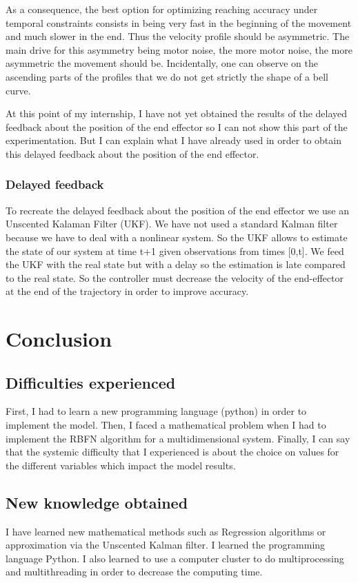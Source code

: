 \documentclass[pdftex,a4paper,12pt]{report}
\begin{document}
As a consequence, the best option for optimizing reaching accuracy under
temporal constraints consists in being very fast in the beginning of the movement
and much slower in the end. Thus the velocity profile should be asymmetric. The main drive
for this asymmetry being motor noise, the more motor noise, the more asymmetric the movement should be.
Incidentally, one can observe on the ascending parts of the profiles that we do not get strictly the shape of a bell curve.

At this point of my internship, I have not yet obtained the results of the delayed feedback about the position of the end effector so I can not show this part of the experimentation.
But I can explain what I have already used in order to obtain this delayed feedback about the position of the end effector.

\subsection{Delayed feedback}
To recreate the delayed feedback about the position of the end effector we use an Unscented Kalaman Filter (UKF). We have not used a standard Kalman filter because we have to deal with a nonlinear system.
So the UKF allows to estimate the state of our system at time t+1 given observations from times [0,t].
We feed the UKF with the real state but with a delay so the estimation is late compared to the real state. So the controller must decrease the velocity of the end-effector at the end of the trajectory in order to improve accuracy.

\chapter{Conclusion}
\section{Difficulties experienced}
First, I had to learn a new programming language (python) in order to implement the model.
Then, I faced a mathematical problem when I had to implement the RBFN algorithm for a multidimensional system.
Finally, I can say that the systemic difficulty that I experienced is about the choice on values for the different variables which impact the model results.

\section{New knowledge obtained}
I have learned new mathematical methods such as Regression algorithms or approximation via the Unscented Kalman filter.
I learned the programming language Python.
I also learned to use a computer cluster to do multiprocessing and multithreading in order to decrease the computing time.
\end{document}
